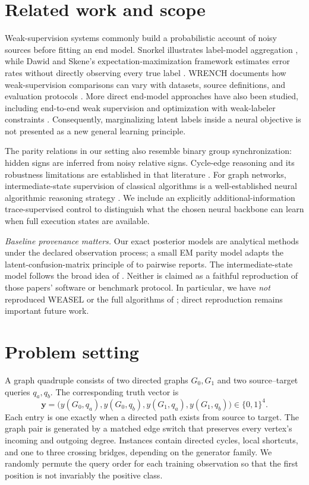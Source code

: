 \documentclass[10pt]{article}
\begin{document}
\section{Related work and scope}
Weak-supervision systems commonly build a probabilistic account of noisy sources before fitting an end model. Snorkel illustrates label-model aggregation \cite{Ratner2017}, while Dawid and Skene's expectation-maximization framework estimates error rates without directly observing every true label \cite{DawidSkene1979}. WRENCH documents how weak-supervision comparisons can vary with datasets, source definitions, and evaluation protocols \cite{Zhang2021Wrench}. More direct end-model approaches have also been studied, including end-to-end weak supervision \cite{Cachay2021} and optimization with weak-labeler constraints \cite{Agrawal2025}. Consequently, marginalizing latent labels inside a neural objective is not presented as a new general learning principle.

The parity relations in our setting also resemble binary group synchronization: hidden signs are inferred from noisy relative signs. Cycle-edge reasoning and its robustness limitations are established in that literature \cite{LermanShi2022}. For graph networks, intermediate-state supervision of classical algorithms is a well-established neural algorithmic reasoning strategy \cite{Velickovic2020}. We include an explicitly additional-information trace-supervised control to distinguish what the chosen neural backbone can learn when full execution states are available.

\emph{Baseline provenance matters.} Our exact posterior models are analytical methods under the declared observation process; a small EM parity model adapts the latent-confusion-matrix principle of \cite{DawidSkene1979} to pairwise reports. The intermediate-state model follows the broad idea of \cite{Velickovic2020}. Neither is claimed as a faithful reproduction of those papers' software or benchmark protocol. In particular, we have \emph{not} reproduced WEASEL or the full algorithms of \cite{Agrawal2025}; direct reproduction remains important future work.

\section{Problem setting}
A graph quadruple consists of two directed graphs $G_0,G_1$ and two source--target queries $q_a,q_b$. The corresponding truth vector is
\begin{equation}
\mathbf y=\bigl(y(G_0,q_a),y(G_0,q_b),y(G_1,q_a),y(G_1,q_b)\bigr)\in\{0,1\}^4.
\end{equation}
Each entry is one exactly when a directed path exists from source to target. The graph pair is generated by a matched edge switch that preserves every vertex's incoming and outgoing degree. Instances contain directed cycles, local shortcuts, and one to three crossing bridges, depending on the generator family. We randomly permute the query order for each training observation so that the first position is not invariably the positive class.
\end{document}
